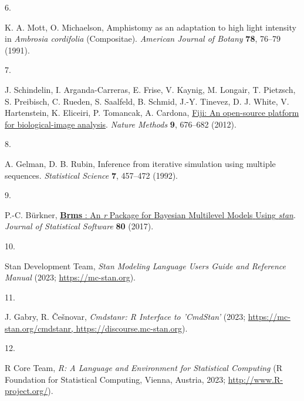 \documentclass[
  letterpaper,
  DIV=11,
  numbers=noendperiod]{scrartcl}
\newlength{\cslhangindent}
\newlength{\csllabelwidth}
\newenvironment{CSLReferences}[2] %
 {\begin{list}{}{%
  \setlength{\itemindent}{0pt}
  \setlength{\leftmargin}{0pt}
  \setlength{\parsep}{0pt}
  \ifodd #1
   \setlength{\leftmargin}{\cslhangindent}
   \setlength{\itemindent}{-1\cslhangindent}
  \fi
  \setlength{\itemsep}{#2\baselineskip}}}
 {\end{list}}
\newcommand{\CSLLeftMargin}[1]{\parbox[t]{\csllabelwidth}{\strut#1\strut}}
\newcommand{\CSLRightInline}[1]{\parbox[t]{\linewidth - \csllabelwidth}{\strut#1\strut}}
\begin{document}
\begin{CSLReferences}{0}{1}
\CSLLeftMargin{6. }%
\CSLRightInline{K. A. Mott, O. Michaelson, Amphistomy as an adaptation
to high light intensity in \emph{{Ambrosia} cordifolia} ({Compositae}).
\emph{American Journal of Botany} \textbf{78}, 76--79 (1991).}

\CSLLeftMargin{7. }%
\CSLRightInline{J. Schindelin, I. Arganda-Carreras, E. Frise, V. Kaynig,
M. Longair, T. Pietzsch, S. Preibisch, C. Rueden, S. Saalfeld, B.
Schmid, J.-Y. Tinevez, D. J. White, V. Hartenstein, K. Eliceiri, P.
Tomancak, A. Cardona, \href{https://doi.org/10.1038/nmeth.2019}{Fiji: An
open-source platform for biological-image analysis}. \emph{Nature
Methods} \textbf{9}, 676--682 (2012).}

\CSLLeftMargin{8. }%
\CSLRightInline{A. Gelman, D. B. Rubin, Inference from iterative
simulation using multiple sequences. \emph{Statistical Science}
\textbf{7}, 457--472 (1992).}

\CSLLeftMargin{9. }%
\CSLRightInline{P.-C. Bürkner,
\href{https://doi.org/10.18637/jss.v080.i01}{\textbf{Brms} : {An}
\emph{r} {Package} for {Bayesian} {Multilevel} {Models} {Using}
\emph{stan}}. \emph{Journal of Statistical Software} \textbf{80}
(2017).}

\CSLLeftMargin{10. }%
\CSLRightInline{Stan Development Team, \emph{Stan {Modeling} {Language}
{Users} {Guide} and {Reference} {Manual}} (2023;
\url{https://mc-stan.org}).}

\CSLLeftMargin{11. }%
\CSLRightInline{J. Gabry, R. Češnovar, \emph{Cmdstanr: {R} {Interface}
to '{CmdStan}'} (2023;
\href{https://mc-stan.org/cmdstanr,\%20https://discourse.mc-stan.org}{https://mc-stan.org/cmdstanr,
https://discourse.mc-stan.org}).}

\CSLLeftMargin{12. }%
\CSLRightInline{R Core Team, \emph{R: {A} {Language} and {Environment}
for {Statistical} {Computing}} (R Foundation for Statistical Computing,
Vienna, Austria, 2023; \url{http://www.R-project.org/}).}

\end{CSLReferences}
\end{document}
